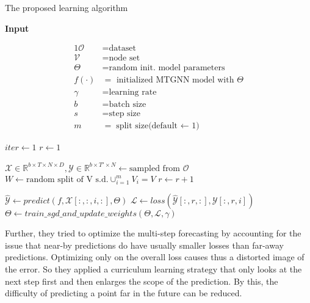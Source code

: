 \documentclass[letterpaper,twocolumn,11pt]{article}
\begin{document}
    \begin{algorithm}
        \scriptsize
        \caption{The proposed learning algorithm}\label{learning}
        \textbf{Input}

        \begin{alignat*}{1}
            \mathcal{O} &= \text{dataset} \\
            \mathcal{V} &= \text{node set} \\
            \Theta &= \text{random init. model parameters} \\
            f(\cdot) &= \text{ initialized MTGNN model with } \Theta  \\
            \gamma &= \text{learning rate} \\
            b &= \text{batch size} \\
            s &= \text{step size} \\
            m &= \text{split size(default $\gets$ 1)}
        \end{alignat*}

        \begin{algorithmic}[1]
            \State $iter \gets 1$
            \State $r \gets 1$

            \Repeat
                \State $\mathcal{X} \in \mathbb{R}^{b \times T \times N \times D},\mathcal{Y} \in \mathbb{R}^{b \times T' \times N} \gets \text{sampled from }\mathcal{O}$
                \State $W \gets \text{random split of V s.d.} \cup_{i=1}^m V_i = V $
                    \State $r \gets r+1$
                \EndIf

                    \State $\hat{\mathcal{Y}} \gets predict(f, \mathcal{X}[:,:,i,:], \Theta)$
                    \State $\mathcal{L} \gets loss(\hat{\mathcal{Y}}[:,r,:], \mathcal{Y}[:,r,i])$
                    \State $\Theta \gets train\_sgd\_and\_update\_weights(\Theta,\mathcal{L}, \gamma)$
                \EndFor
        \end{algorithmic}
    \end{algorithm}

    Further, they tried to optimize the multi-step forecasting by accounting for the issue that near-by predictions do have usually smaller losses than far-away predictions.
    Optimizing only on the overall loss causes thus a distorted image of the error.
    So they applied a curriculum learning strategy that only looks at the next step first and then enlarges the scope of the prediction.
    By this, the difficulty of predicting a point far in the future can be reduced.
\end{document}
